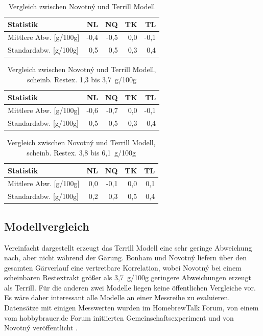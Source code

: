 \documentclass[a4paper,parskip=half]{scrartcl}
\begin{document}
\begin{table}[h]
\centering
\begin{tabular}{lrrrr}
\toprule
Statistik & NL & NQ & TK & TL \\
\midrule
Mittlere Abw. [g/100g] & -0,4 & -0,5 & 0,0 & -0,1 \\
Standardabw. [g/100g] & 0,5 & 0,5 & 0,3 & 0,4 \\
\bottomrule
\end{tabular}
\caption{Vergleich zwischen Novotný und Terrill Modell \parencite{h22lude2020}}
\label{table:terrillnovotnycomp}
\end{table}

\begin{table}[h]
\centering
\begin{tabular}{lrrrr}
\toprule
Statistik & NL & NQ & TK & TL \\
\midrule
Mittlere Abw. [g/100g] & -0,6 & -0,7 & 0,0 & -0,1 \\
Standardabw. [g/100g] & 0,5 & 0,5 & 0,3 & 0,4 \\
\bottomrule
\end{tabular}
\caption{Vergleich zwischen Novotný und Terrill Modell, scheinb. Restex. 1,3 bis 3,7~g/100g \parencite{h22lude2020}}
\label{table:terrillnovotnycomplg}
\end{table}

\begin{table}[h]
\centering
\begin{tabular}{lrrrr}
\toprule
Statistik & NL & NQ & TK & TL \\
\midrule
Mittlere Abw. [g/100g] & 0,0 & -0,1 & 0,0 & 0,1 \\
Standardabw. [g/100g] & 0,2 & 0,3 & 0,5 & 0,4 \\
\bottomrule
\end{tabular}
\caption{Vergleich zwischen Novotný und Terrill Modell, scheinb. Restex. 3,8 bis 6,1~g/100g \parencite{h22lude2020}}
\label{table:terrillnovotnycomphg}
\end{table}

\subsection*{Modellvergleich}

Vereinfacht dargestellt erzeugt das Terrill Modell eine sehr geringe
Abweichung nach, aber nicht während der Gärung. Bonham und Novotný
liefern über den gesamten Gärverlauf eine vertretbare Korrelation,
wobei Novotný bei einem scheinbaren Restextrakt größer als 3,7~g/100g
geringere Abweichungen erzeugt als Terrill. Für die anderen zwei Modelle
liegen keine öffentlichen Vergleiche vor. Es wäre daher interessant
alle Modelle an einer Messreihe zu evaluieren. Datensätze mit einigen
Messwerten wurden im HomebrewTalk Forum, von einem vom hobbybrauer.de Forum
initiierten Gemeinschaftsexperiment und von Novotný veröffentlicht
\parencites{Novotny2017a}{Katman2019}{Wolf2015}.
\end{document}
